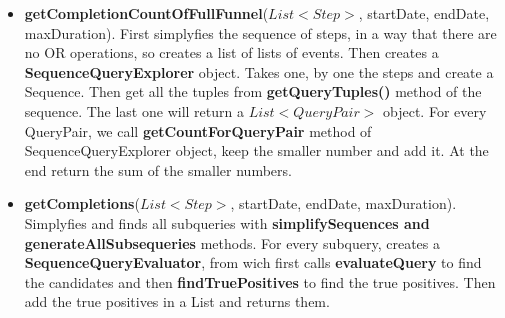 \documentclass{article}
\begin{document}
\begin{itemize}
\begin{itemize}
	\item \textbf{getCompletionCountOfFullFunnel}($List<Step>$, startDate, endDate, maxDuration). First simplyfies the sequence of steps, in a way that there are no OR operations, so creates a list of lists of events. Then creates a \textbf{SequenceQueryExplorer} object. Takes one, by one the steps and create a Sequence. Then get all the tuples from \textbf{getQueryTuples()} method of the sequence. The last one will return a $List<QueryPair>$ object. For every QueryPair, we call \textbf{getCountForQueryPair} method of SequenceQueryExplorer object, keep the smaller number and add it. At the end return the sum of the smaller numbers.
	\item \textbf{getCompletions}($List<Step>$, startDate, endDate, maxDuration). Simplyfies and finds all subqueries with \textbf{simplifySequences and generateAllSubsequeries} methods. For every subquery, creates a \textbf{SequenceQueryEvaluator}, from wich first calls \textbf{evaluateQuery} to find the candidates and then \textbf{findTruePositives} to find the true positives. Then add the true positives in a List and returns them.
\end{itemize}
\end{itemize}
\end{document}
